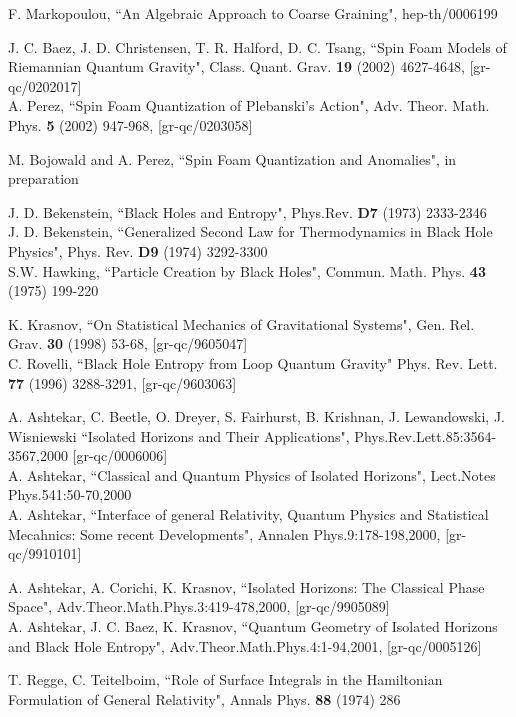 \documentclass[12pt]{report}
\begin{document}
\begin{thebibliography}{99}
 F. Markopoulou, ``An Algebraic Approach to Coarse Graining",
hep-th/0006199

J. C. Baez, J. D. Christensen, T. R. Halford, D. C. Tsang, ``Spin Foam 
Models of Riemannian Quantum Gravity", Class. Quant. Grav. 
{\bf 19} (2002) 4627-4648, [gr-qc/0202017]\\
A. Perez, ``Spin Foam Quantization of Plebanski's Action", 
Adv. Theor. Math. Phys. {\bf 5} (2002) 947-968, [gr-qc/0203058] 

 M. Bojowald and A. Perez, ``Spin Foam Quantization
and Anomalies", in preparation

 J. D. Bekenstein, ``Black Holes and Entropy",
Phys.Rev. {\bf D7} (1973) 2333-2346\\
J. D. Bekenstein, ``Generalized Second Law for Thermodynamics
in Black Hole Physics", Phys. Rev. {\bf D9} (1974) 3292-3300\\
S.W. Hawking, ``Particle Creation by Black Holes", 
Commun. Math. Phys. {\bf 43} (1975) 199-220 

 K. Krasnov, ``On Statistical Mechanics of Gravitational Systems",
Gen. Rel. Grav. {\bf 30} (1998) 53-68, [gr-qc/9605047]\\
C. Rovelli, ``Black Hole Entropy from Loop Quantum Gravity"  
Phys. Rev. Lett. {\bf 77} (1996) 3288-3291, [gr-qc/9603063]

A. Ashtekar, C. Beetle, O. Dreyer, S. Fairhurst,
B. Krishnan, J. Lewandowski, J. Wisniewski
``Isolated Horizons and Their Applications",
Phys.Rev.Lett.85:3564-3567,2000 [gr-qc/0006006]\\
A. Ashtekar, ``Classical and Quantum Physics of Isolated Horizons",
Lect.Notes Phys.541:50-70,2000\\
A. Ashtekar, ``Interface of general Relativity, Quantum Physics and
Statistical Mecahnics: Some recent Developments", Annalen
Phys.9:178-198,2000, [gr-qc/9910101] 

 A. Ashtekar, A. Corichi, K. Krasnov,
``Isolated Horizons: The Classical Phase Space",
Adv.Theor.Math.Phys.3:419-478,2000, [gr-qc/9905089]\\
A. Ashtekar, J. C. Baez, K. Krasnov,
``Quantum Geometry of Isolated Horizons and Black Hole Entropy",
Adv.Theor.Math.Phys.4:1-94,2001, [gr-qc/0005126]

 T. Regge, C. Teitelboim, ``Role of Surface Integrals in the 
Hamiltonian Formulation of General Relativity", 
Annals Phys. {\bf 88} (1974) 286


\end{thebibliography}
\end{document}
